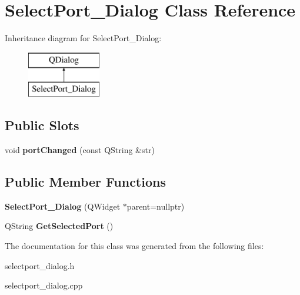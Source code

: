 \hypertarget{class_select_port___dialog}{}\section{Select\+Port\+\_\+\+Dialog Class Reference}
\label{class_select_port___dialog}
Inheritance diagram for Select\+Port\+\_\+\+Dialog\+:\begin{figure}[H]
\begin{center}
\leavevmode
\includegraphics[height=2.000000cm]{class_select_port___dialog}
\end{center}
\end{figure}
\subsection*{Public Slots}
\begin{DoxyCompactItemize}
\item 
\mbox{\label{class_select_port___dialog_a589d23c1533461dd4e50330871b71d19}} 
void {\bfseries port\+Changed} (const Q\+String \&str)
\end{DoxyCompactItemize}
\subsection*{Public Member Functions}
\begin{DoxyCompactItemize}
\item 
\mbox{\label{class_select_port___dialog_a979e7d2f89e7cc44c5ce89413d6d58b9}} 
{\bfseries Select\+Port\+\_\+\+Dialog} (Q\+Widget $\ast$parent=nullptr)
\item 
\mbox{\label{class_select_port___dialog_a1e455b79998dcee1f170eb34e43e4a26}} 
Q\+String {\bfseries Get\+Selected\+Port} ()
\end{DoxyCompactItemize}


The documentation for this class was generated from the following files\+:\begin{DoxyCompactItemize}
\item 
selectport\+\_\+dialog.\+h\item 
selectport\+\_\+dialog.\+cpp\end{DoxyCompactItemize}
